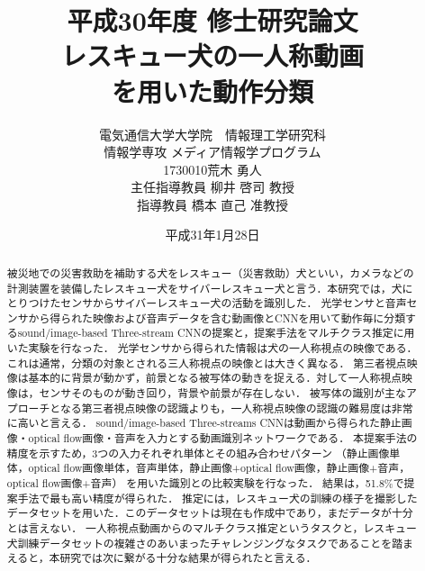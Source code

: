\documentclass[a4j,12pt]{jreport}
\title{
	平成30年度 修士研究論文\vspace{1cm}\\
	\huge  レスキュー犬の一人称動画\\を用いた動作分類\vspace{6cm}
}
\author{
	電気通信大学大学院　情報理工学研究科\\
	情報学専攻 メディア情報学プログラム\\
	1730010\hspace{1cm}荒木 勇人\\
	主任指導教員 柳井 啓司 教授\\
        指導教員 橋本 直己 准教授
}
\date{
平成31年1月28日
}
\begin{document}
\maketitle
\thispagestyle{empty}
\pagebreak

\begin{abstract}

被災地での災害救助を補助する犬をレスキュー（災害救助）犬といい，カメラなどの計測装置を装備したレスキュー犬をサイバーレスキュー犬と言う．本研究では，犬にとりつけたセンサからサイバーレスキュー犬の活動を識別した．
光学センサと音声センサから得られた映像および音声データを含む動画像とCNNを用いて動作毎に分類するsound/image-based Three-stream CNNの提案と，提案手法をマルチクラス推定に用いた実験を行なった．
光学センサから得られた情報は犬の一人称視点の映像である．これは通常，分類の対象とされる三人称視点の映像とは大きく異なる．
第三者視点映像は基本的に背景が動かず，前景となる被写体の動きを捉える．対して一人称視点映像は，センサそのものが動き回り，背景や前景が存在しない．
被写体の識別が主なアプローチとなる第三者視点映像の認識よりも，一人称視点映像の認識の難易度は非常に高いと言える．
sound/image-based Three-streams CNNは動画から得られた静止画像・optical flow画像・音声を入力とする動画識別ネットワークである．
本提案手法の精度を示すため，3つの入力それぞれ単体とその組み合わせパターン
（静止画像単体，optical flow画像単体，音声単体，静止画像+optical flow画像，静止画像+音声，optical flow画像+音声）
を用いた識別との比較実験を行なった．
結果は，51.8\%で提案手法で最も高い精度が得られた．
推定には，レスキュー犬の訓練の様子を撮影したデータセットを用いた．このデータセットは現在も作成中であり，まだデータが十分とは言えない．
一人称視点動画からのマルチクラス推定というタスクと，レスキュー犬訓練データセットの複雑さのあいまったチャレンジングなタスクであることを踏まえると，本研究では次に繋がる十分な結果が得られたと言える．


\par


\end{abstract}

\pagestyle{jgraduate}


\tableofcontents

\pagebreak

\newpage











%

\end{document}
